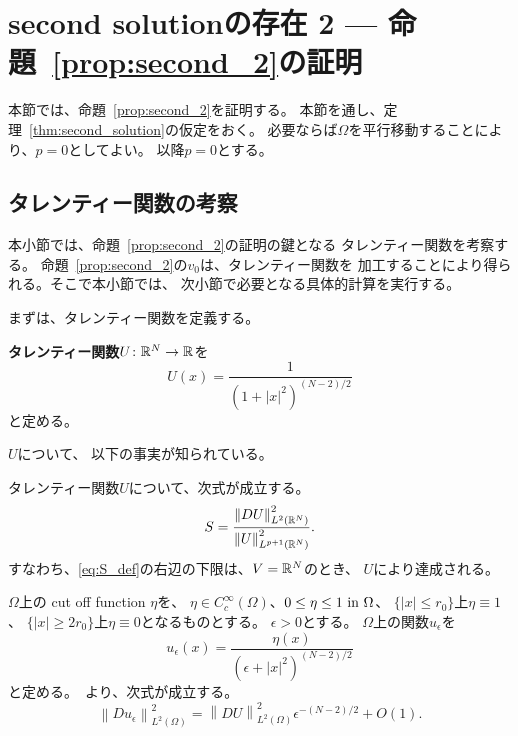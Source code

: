 \section{second solutionの存在 2 --- 命題~\ref{prop:second_2}の証明}

本節では、命題~\ref{prop:second_2}を証明する。
本節を通し、定理~\ref{thm:second_solution}の仮定をおく。
必要ならば$\Omega$を平行移動することにより、$p = 0$としてよい。
以降$p = 0$とする。

\subsection{タレンティー関数の考察}

本小節では、命題~\ref{prop:second_2}の証明の鍵となる
タレンティー関数を考察する。
命題~\ref{prop:second_2}の$v_0$は、タレンティー関数を
加工することにより得られる。そこで本小節では、
次小節で必要となる具体的計算を実行する。

まずは、タレンティー関数を定義する。
\begin{defn}
 {\bf タレンティー関数}$U \colon \mathbb{R}^N \to \mathbb{R}$を
 \[
   U(x) = \frac{1}{(1 + \lvert x \rvert^2)^{(N-2)/2}}
 \]
 と定める。
\end{defn}

$U$について、
以下の事実が知られている。

\begin{lem}
 タレンティー関数$U$について、次式が成立する。
 \begin{equation}
  S = \frac{\left\| DU \right\|_{L^2(\mathbb{R}^N)}^2}
   {\left\| U \right\|_{L^{p+1}(\mathbb{R}^N)}^2}. 
   \label{eq:S_ach}
 \end{equation}
 すなわち、\eqref{eq:S_def}の右辺の下限は、$V = \mathbb{R}^N$のとき、
 $U$により達成される。
\end{lem}

$\Omega$上の cut off function $\eta$を、
$\eta \in C^\infty_c (\Omega)$、$0 \leq \eta \leq 1 ~\text{in}~
\Omega$、
$\{ \lvert x \rvert \leq r_0 \}$上$\eta \equiv 1$、
$\{ \lvert x \rvert \geq 2r_0 \}$上$\eta \equiv 0$となるものとする。
$\epsilon > 0$とする。
$\Omega$上の関数$u_\epsilon$を
\[
 u_\epsilon (x) = \frac{\eta(x)}{(\epsilon + \lvert x \rvert^2)^{(N-2)/2}}
\]
と定める。\cite{MR709644}~より、次式が成立する。
\begin{equation}
 \left\| Du_\epsilon \right\|_{L^2(\Omega)}^2 
  = \left\| DU \right\|_{L^2(\Omega)}^2 \epsilon^{-(N-2)/2} + O(1).
  \label{eq:Duepsilon}
\end{equation}

